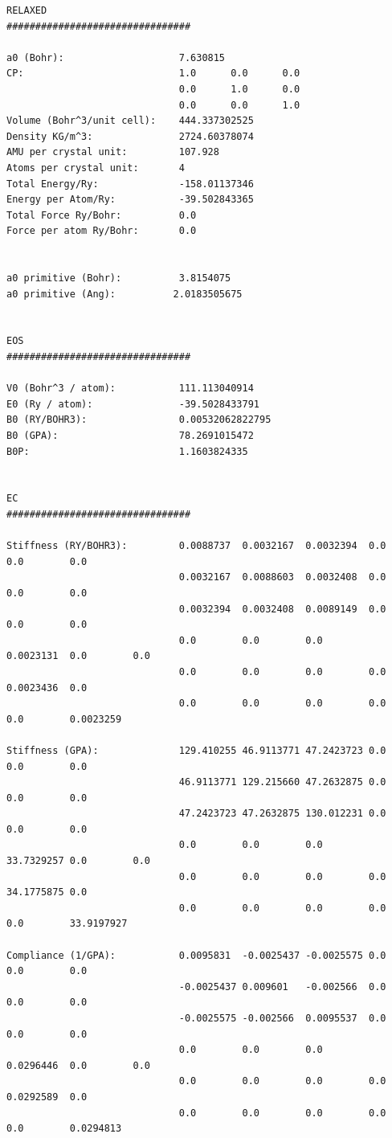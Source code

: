 \documentclass[12pt,twoside]{manual}
\begin{document}
\begin{appendices}
\begin{lstlisting}[style=inputfile,caption={Results File}]
RELAXED
################################

a0 (Bohr):                    7.630815
CP:                           1.0      0.0      0.0
                              0.0      1.0      0.0
                              0.0      0.0      1.0
Volume (Bohr^3/unit cell):    444.337302525
Density KG/m^3:               2724.60378074
AMU per crystal unit:         107.928
Atoms per crystal unit:       4
Total Energy/Ry:              -158.01137346
Energy per Atom/Ry:           -39.502843365
Total Force Ry/Bohr:          0.0
Force per atom Ry/Bohr:       0.0


a0 primitive (Bohr):          3.8154075
a0 primitive (Ang):          2.0183505675


EOS
################################

V0 (Bohr^3 / atom):           111.113040914
E0 (Ry / atom):               -39.5028433791
B0 (RY/BOHR3):                0.00532062822795
B0 (GPA):                     78.2691015472
B0P:                          1.1603824335


EC
################################

Stiffness (RY/BOHR3):         0.0088737  0.0032167  0.0032394  0.0        0.0        0.0       
                              0.0032167  0.0088603  0.0032408  0.0        0.0        0.0       
                              0.0032394  0.0032408  0.0089149  0.0        0.0        0.0       
                              0.0        0.0        0.0        0.0023131  0.0        0.0       
                              0.0        0.0        0.0        0.0        0.0023436  0.0       
                              0.0        0.0        0.0        0.0        0.0        0.0023259 

Stiffness (GPA):              129.410255 46.9113771 47.2423723 0.0        0.0        0.0       
                              46.9113771 129.215660 47.2632875 0.0        0.0        0.0       
                              47.2423723 47.2632875 130.012231 0.0        0.0        0.0       
                              0.0        0.0        0.0        33.7329257 0.0        0.0       
                              0.0        0.0        0.0        0.0        34.1775875 0.0       
                              0.0        0.0        0.0        0.0        0.0        33.9197927

Compliance (1/GPA):           0.0095831  -0.0025437 -0.0025575 0.0        0.0        0.0       
                              -0.0025437 0.009601   -0.002566  0.0        0.0        0.0       
                              -0.0025575 -0.002566  0.0095537  0.0        0.0        0.0       
                              0.0        0.0        0.0        0.0296446  0.0        0.0       
                              0.0        0.0        0.0        0.0        0.0292589  0.0       
                              0.0        0.0        0.0        0.0        0.0        0.0294813 


\end{lstlisting}
\end{appendices}
\end{document}
